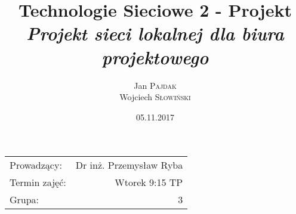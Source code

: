 \documentclass{article}
\title{Technologie Sieciowe 2 - Projekt \\ \textit{Projekt sieci lokalnej dla biura projektowego}} %
\author{Jan \textsc{Pajdak} \\ Wojciech \textsc{Słowiński}} %
\date{05.11.2017} %
\begin{document}
\maketitle %

\begin{center}
\begin{tabular}{l r}
Prowadzący: & Dr inż. Przemysław Ryba \\
Termin zajęć: & Wtorek 9:15 TP \\
Grupa: & 3 
\end{tabular}
\end{center}

\tableofcontents %






\end{document}
